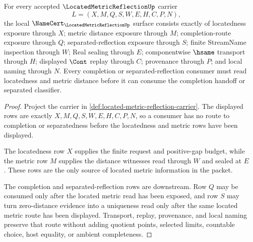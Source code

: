 \begin{theorem}
\label{thm:located-metric-reflection-namecert-obligations}
For every accepted $\LocatedMetricReflectionUp$ carrier
$$
L=(X,M,Q,S,W,E,H,C,P,N),
$$
the local $\NameCert_{\LocatedMetricReflectionUp}$ surface consists exactly of locatedness exposure through $X$; metric distance exposure through $M$; completion-route exposure through $Q$; separated-reflection exposure through $S$; finite StreamName inspection through $W$; Real sealing through $E$; componentwise $\hsame$ transport through $H$; displayed $\Cont$ replay through $C$; provenance through $P$; and local naming through $N$. Every completion or separated-reflection consumer must read locatedness and metric distance before it can consume the completion handoff or separated classifier.
\end{theorem}
\begin{proof}
Project the carrier in \autoref{def:located-metric-reflection-carrier}. The displayed rows are exactly $X,M,Q,S,W,E,H,C,P,N$, so a consumer has no route to completion or separatedness before the locatedness and metric rows have been displayed.

The locatedness row $X$ supplies the finite request and positive-gap budget, while the metric row $M$ supplies the distance witnesses read through $W$ and sealed at $E$. These rows are the only source of located metric information in the packet.

The completion and separated-reflection rows are downstream. Row $Q$ may be consumed only after the located metric read has been exposed, and row $S$ may turn zero-distance evidence into a uniqueness read only after the same located metric route has been displayed. Transport, replay, provenance, and local naming preserve that route without adding quotient points, selected limits, countable choice, host equality, or ambient completeness.
\end{proof}

